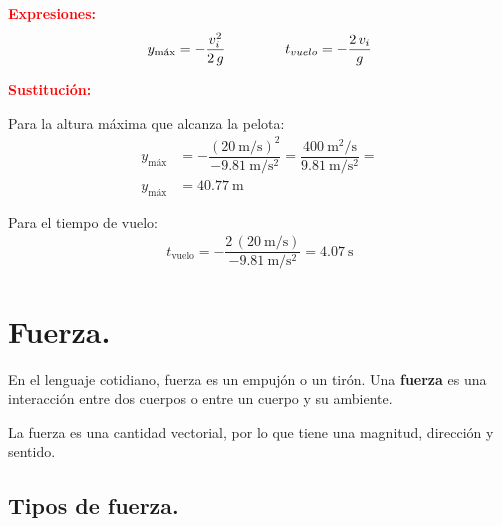 \documentclass[14pt]{extarticle}
\newcommand{\textocolor}[2]{\textbf{\textcolor{#1}{#2}}}
\begin{document}
\vspace*{0.5cm}
\textocolor{red}{Expresiones:}
\begin{align*}
y_{\text{máx}} = - \dfrac{v_{i}^{2}}{2 \, g} \hspace{1.5cm} t_{vuelo} = - \dfrac{2 \, v_{i}}{g}
\end{align*}

\vspace*{0.5cm}
\textocolor{red}{Sustitución:}

Para la altura máxima que alcanza la pelota:
\begin{align*}
y_{\text{máx}} &= - \dfrac{ \displaystyle\left( \SI[per-mode=fraction]{20}{\meter\per\second}\right)^{2}}{ \displaystyle - \SI[per-mode=fraction]{9.81}{\meter\per\square\second}} = \dfrac{\displaystyle \SI[per-mode=fraction]{400}{\square\meter\per\second}}{\displaystyle \SI[per-mode=fraction]{9.81}{\meter\per\square\second}} = \\[0.5em]
y_{\text{máx}} &= \SI{40.77}{\meter}
\end{align*}

\vspace*{0.3cm}
Para el tiempo de vuelo:
\begin{align*}
t_{\text{vuelo}} = - \dfrac{2 \, \left( \displaystyle \SI[per-mode=fraction]{20}{\meter\per\second} \right)}{\displaystyle - \SI[per-mode=fraction]{9.81}{\meter\per\square\second}} = \SI[per-mode=fraction]{4.07}{\second}
\end{align*}


\section{Fuerza.}

En el lenguaje cotidiano, fuerza es un empujón o un tirón. Una \textocolor{byzantine}{fuerza} es una interacción entre dos cuerpos o entre un cuerpo y su ambiente.

La fuerza es una cantidad vectorial, por lo que tiene una magnitud, dirección y sentido.

\subsection{Tipos de fuerza.}
\end{document}
